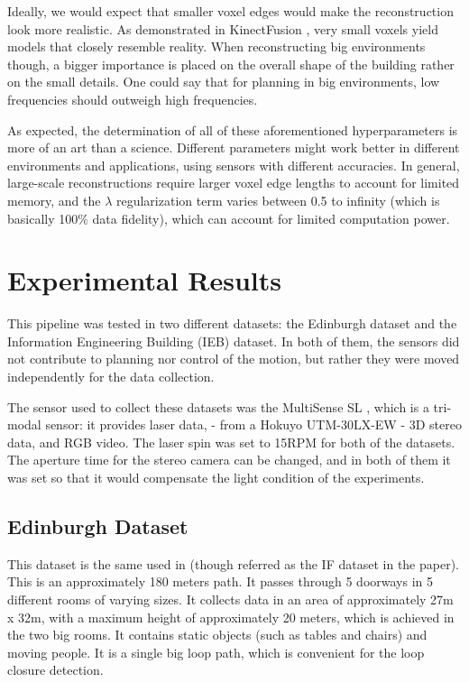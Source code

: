 \documentclass[11pt]{article}
\begin{document}
Ideally, we would expect that smaller voxel edges would make the reconstruction look more realistic. As demonstrated in KinectFusion \cite{kinectfusion}, very small voxels yield models that closely resemble reality. When reconstructing big environments though, a bigger importance is placed on the overall shape of the building rather on the small details. One could say that for planning in big environments, low frequencies should outweigh high frequencies. 

As expected, the determination of all of these aforementioned hyperparameters is more of an art than a science. Different parameters might work better in different environments and applications, using sensors with different accuracies. In general, large-scale reconstructions require larger voxel edge lengths to account for limited memory, and the $\lambda$ regularization term varies between 0.5 to infinity (which is basically 100\% data fidelity), which can account for limited computation power.
			
	\newpage
	\section{Experimental Results}
	\label{subs:experiments}

This pipeline was tested in two different datasets: the Edinburgh dataset and the Information Engineering Building (IEB) dataset. In both of them, the sensors did not contribute to planning nor control of the motion, but rather they were moved independently for the data collection.
	
The sensor used to collect these datasets was the MultiSense SL \cite{multisense}, which is a tri-modal sensor: it provides laser data, - from a Hokuyo UTM-30LX-EW \cite{HokuyoDataSheet}- 3D stereo data, and RGB video. The laser spin was set to 15RPM for both of the datasets. The aperture time for the stereo camera can be changed, and in both of them it was set so that it would compensate the light condition of the experiments. 
	
	\subsection{Edinburgh Dataset}

This dataset is the same used in \cite{AICPAlign} (though referred as the IF dataset in the paper). This is an approximately 180 meters path. It passes through 5 doorways in 5 different rooms of varying sizes. It collects data in an area of approximately 27m x 32m, with a maximum height of approximately 20 meters, which is achieved in the two big rooms. It contains static objects (such as tables and chairs) and moving people. It is a single big loop path, which is convenient for the loop closure detection.
	
\end{document}
